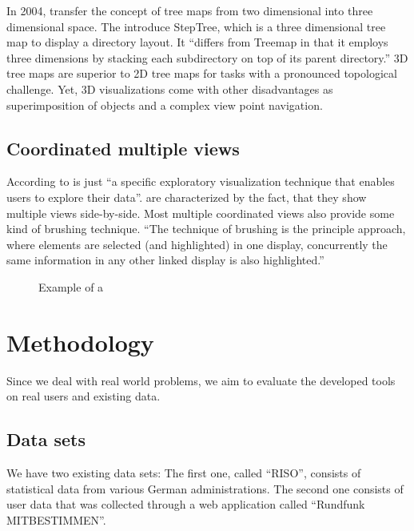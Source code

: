 \documentclass{article}
\begin{document}
In 2004, \textcite{Bladh2004} transfer the concept of tree maps from two dimensional into three dimensional space.
The introduce StepTree, which is a three dimensional tree map to display a directory layout.
It ``differs from Treemap in that it employs three dimensions by stacking each subdirectory on top of its parent directory.''\cite{Bladh2004}
3D tree maps are superior to 2D tree maps for tasks with a pronounced topological challenge.
Yet, 3D visualizations come with other disadvantages as superimposition of objects and a complex view point navigation.


\subsection{Coordinated multiple views}
According to \textcite{cmv:state_of_the_art} \cmvs{} is just ``a specific exploratory visualization technique that enables users to explore their data''.
\cmvs{} are characterized by the fact, that they show multiple views side-by-side.
Most multiple coordinated views also provide some kind of brushing technique.
``The technique of brushing is the principle approach, where elements are selected (and highlighted) in one display, concurrently the same information in any other linked display is also highlighted.''\cite{cmv:state_of_the_art}

\begin{figure}[h]
\centering
\caption{Example of a \cmvs{}}
\label{fig:research:cmv}
\end{figure}

\section{Methodology}

Since we deal with real world problems, we aim to evaluate the developed tools on real users and existing data.

\subsection{Data sets}
We have two existing data sets:
The first one, called ``RISO'', consists of statistical data from various German administrations.
The second one consists of user data that was collected through a web application called ``Rundfunk MITBESTIMMEN''.

\end{document}
